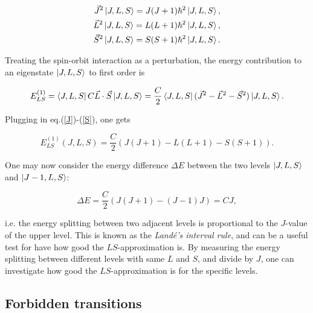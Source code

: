 \documentclass[a4paper]{article}
\begin{document}
\begin{eqnarray}

\vec{J}^2 \Ket{J,L,S} = J(J+1) \hbar^2 \Ket{J,L,S}, \label{J} \\

\vec{L}^2 \Ket{J,L,S} = L(L+1) \hbar^2 \Ket{J,L,S}, \\

\vec{S}^2 \Ket{J,L,S} = S(S+1) \hbar^2 \Ket{J,L,S}. \label{S}

\end{eqnarray}

Treating the spin-orbit interaction as a perturbation, the energy contribution to an eigenstate $\Ket{J,L,S}$ to first order is

\begin{equation}

E_{LS}^{(1)} = \Bra{J,L,S} C \vec{L}\cdot\vec{S} \Ket{J,L,S} = \frac{C}{2} \Bra{J,L,S} (\vec{J}^2-\vec{L}^2-\vec{S}^2) \Ket{J,L,S}.

\end{equation}

Plugging in eq.(\ref{J})-(\ref{S}), one gets

\begin{equation}

E_{LS}^{(1)}(J,L,S) = \frac{C}{2} (J(J+1) - L(L+1) - S(S+1)).

\end{equation}

One may now consider the energy difference $\Delta E$ between the two levels $\Ket{J,L,S}$ and $\Ket{J-1,L,S}$:

\begin{equation}

\Delta E = \frac{C}{2} ( J(J+1) - (J-1)J ) = C J,

\end{equation}

i.e. the energy splitting between two adjacent levels is proportional to the $J$-value of the upper level. This is known as the \textit{Land\'e's interval rule}, and can be a useful test for have how good the $LS$-approximation is. By measuring the energy splitting between different levels with same $L$ and $S$, and divide by $J$, one can investigate how good the $LS$-approximation is for the specific levels.

\subsection{Forbidden transitions}
\end{document}
